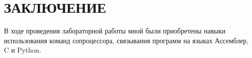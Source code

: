 \section*{ЗАКЛЮЧЕНИЕ}

В ходе проведения лабораторной работы мной были приобретены 
навыки использования команд сопроцессора, 
связывания программ на языках Ассемблер, C и Python. 
\newpage

